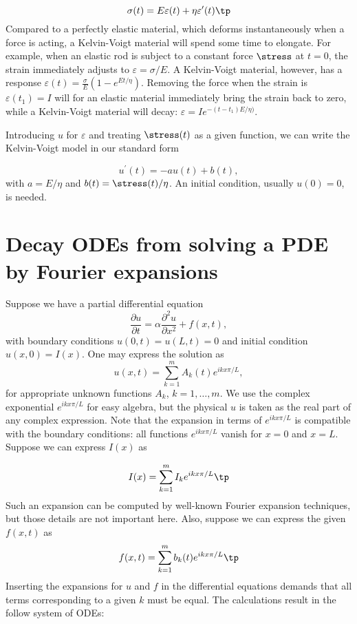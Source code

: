 \documentclass[graybox,sectrefs,envcountresetchap,open=right,final]{svmonodo}
\begin{document}
\begin{equation}
\sigma(t) = E\varepsilon(t) + \eta\varepsilon^{\prime}(t)\tp
\label{decay:app:viscoelasticity:se}
\end{equation}
Compared to a perfectly elastic material, which deforms instantaneously
when a force is acting, a Kelvin-Voigt material will spend some time
to elongate. For example, when an elastic rod is subject to a constant
force $\stress$ at $t=0$, the strain immediately adjusts to $\varepsilon
=\sigma/E$. A Kelvin-Voigt material, however, has a response
$\varepsilon(t) = \frac{\sigma}{E}(1-e^{Et/\eta})$. Removing the force
when the strain is $\varepsilon(t_1) = I$ will for an elastic material
immediately bring the strain back to zero, while a Kelvin-Voigt
material will decay: $\varepsilon = Ie^{-(t-t_1)E/\eta)}$.

Introducing $u$ for $\varepsilon$ and treating $\stress(t)$ as a
given function, we can write the Kelvin-Voigt model in our standard form

\begin{equation}
u^{\prime}(t) = -au(t) + b(t),
\end{equation}
with $a = E/\eta$ and $b(t)=\stress(t)/\eta$. An initial condition,
usually $u(0)=0$, is needed.

\section{Decay ODEs from solving a PDE by Fourier expansions}
\label{decay:app:diffusion:Fourier}


Suppose we have a partial differential equation
\[ \frac{\partial u}{\partial t} = \alpha\frac{\partial^2u}{\partial x^2}
+ f(x,t),
\]
with boundary conditions $u(0,t)=u(L,t)=0$ and initial condition
$u(x,0)=I(x)$. One may express the solution as
\[ u(x,t) = \sum_{k=1}^m A_k(t)e^{ikx\pi/L},\]
for appropriate unknown functions $A_k$, $k=1,\ldots,m$.
We use the complex exponential $e^{ikx\pi/L}$ for easy algebra, but
the physical $u$ is taken as the real part of any complex expression.
Note that the expansion in terms of $e^{ikx\pi/L}$ is compatible with
the boundary conditions: all functions $e^{ikx\pi/L}$ vanish for
$x=0$ and $x=L$. Suppose we can express $I(x)$ as

\[ I(x) = \sum_{k=1}^m I_ke^{ikx\pi/L}
\tp
\]
Such an expansion can be computed by well-known Fourier expansion techniques,
but those details are not important here.
Also, suppose we can express the given $f(x,t)$ as
\[ f(x,t) = \sum_{k=1}^m b_k(t)e^{ikx\pi/L}
\tp
\]
Inserting the expansions for $u$
and $f$ in the differential equations demands that all terms corresponding
to a given $k$ must be equal. The calculations result in the follow
system of ODEs:
\end{document}
